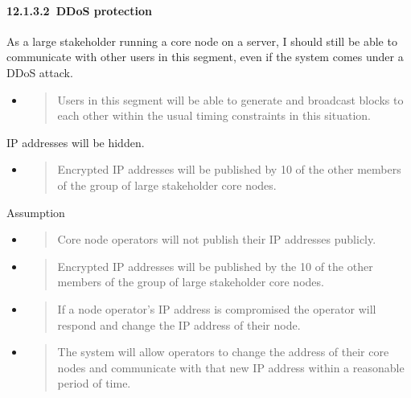 \documentclass[]{article}
\let\oldparagraph\paragraph
\renewcommand{\paragraph}[1]{\oldparagraph{#1}\mbox{}}
\begin{document}
\hypertarget{ddos-protection}{%
\paragraph{​12.1.3.2​~DDoS protection}\label{ddos-protection}}

As a large stakeholder running a core node on a server, I should still
be able to communicate with other users in this segment, even if the
system comes under a DDoS attack.

\begin{itemize}
\item
  \begin{quote}
  Users in this segment will be able to generate and broadcast blocks to
  each other within the usual timing constraints in this situation.
  \end{quote}
\end{itemize}

IP addresses will be hidden.

\begin{itemize}
\item
  \begin{quote}
  Encrypted IP addresses will be published by 10 of the other members of
  the group of large stakeholder core nodes.
  \end{quote}
\end{itemize}

Assumption

\begin{itemize}
\item
  \begin{quote}
  Core node operators will not publish their IP addresses publicly.
  \end{quote}
\item
  \begin{quote}
  Encrypted IP addresses will be published by the 10 of the other
  members of the group of large stakeholder core nodes.
  \end{quote}
\item
  \begin{quote}
  If a node operator's IP address is compromised the operator will
  respond and change the IP address of their node.
  \end{quote}
\item
  \begin{quote}
  The system will allow operators to change the address of their core
  nodes and communicate with that new IP address within a reasonable
  period of time.
  \end{quote}
\end{itemize}
\end{document}
